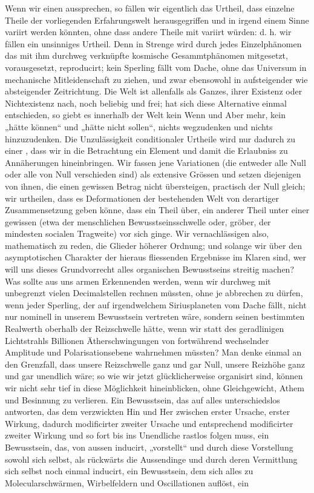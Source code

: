 Wenn wir einen  aussprechen, so fällen wir eigentlich das Urtheil, dass einzelne Theile der vorliegenden Erfahrungswelt herausgegriffen und in irgend einem Sinne variirt werden könnten, ohne dass andere Theile mit variirt würden: d. h. wir fällen ein unsinniges Urtheil. Denn in Strenge wird durch jedes Einzelphänomen das mit ihm durchweg verknüpfte kosmische Gesammtphänomen mitgesetzt, vorausgesetzt, reproducirt; kein Sperling fällt vom Dache, ohne das Universum in mechanische Mitleidenschaft zu ziehen, und zwar ebensowohl in aufsteigender wie absteigender Zeitrichtung. Die Welt ist allenfalls als Ganzes, ihrer Existenz oder Nichtexistenz nach, noch beliebig und frei; hat sich diese Alternative einmal entschieden, so giebt es innerhalb der Welt kein Wenn und Aber mehr, kein „hätte können“ und „hätte nicht sollen“, nichts wegzudenken und nichts hinzuzudenken. Die Unzulässigkeit conditionaler Urtheile wird nur dadurch zu einer  , dass wir in die Betrachtung ein  Element und damit die Erlaubniss zu Annäherungen hineinbringen. Wir fassen jene Variationen (die entweder alle Null oder alle von Null verschieden sind) als extensive Grössen und setzen diejenigen von ihnen, die einen gewissen Betrag nicht übersteigen, practisch der Null gleich; wir urtheilen, dass es Deformationen der bestehenden Welt von derartiger Zusammensetzung geben könne, dass ein Theil über, ein anderer Theil unter einer gewissen  (etwa der menschlichen Bewusstseinsschwelle oder, gröber, der mindesten socialen Tragweite) vor sich ginge. Wir vernachlässigen also, mathematisch zu reden, die Glieder höherer Ordnung; und solange wir über den asymptotischen Charakter der hieraus fliessenden Ergebnisse im Klaren sind, wer will uns dieses Grundvorrecht alles organischen Bewusstseins streitig machen? Was sollte aus uns armen Erkennenden werden, wenn wir durchweg mit unbegrenzt vielen Decimalstellen rechnen müssten, ohne je abbrechen zu dürfen, wenn jeder Sperling, der auf irgendwelchem Siriusplaneten vom Dache fällt, nicht nur nominell in unserem Bewusstsein vertreten wäre, sondern seinen bestimmten Realwerth oberhalb der Reizschwelle hätte, wenn wir statt des geradlinigen Lichtstrahls Billionen Ätherschwingungen von fortwährend wechselnder Amplitude und Polarisationsebene wahrnehmen müssten? Man denke einmal an den Grenzfall, dass unsere Reizschwelle ganz und gar Null, unsere Reizhöhe ganz und gar unendlich wäre; so wie wir jetzt glücklicherweise organisirt sind, können wir nicht sehr tief in diese Möglichkeit hineinblicken, ohne Gleichgewicht, Athem und Besinnung zu verlieren. Ein Bewusstsein, das auf alles unterschiedslos antworten, das dem verzwickten Hin und Her zwischen erster Ursache, erster Wirkung, dadurch modificirter zweiter Ursache und entsprechend modificirter zweiter Wirkung und so fort bis ins Unendliche rastlos folgen muss, ein Bewusstsein, das, von aussen inducirt, „vorstellt“ und durch diese Vorstellung sowohl sich selbst, als rückwärts die Aussendinge und durch deren Vermittlung sich selbst noch einmal inducirt, ein Bewusstsein, dem sich alles zu Molecularschwärmen, Wirbelfeldern und Oscillationen auflöst, ein 